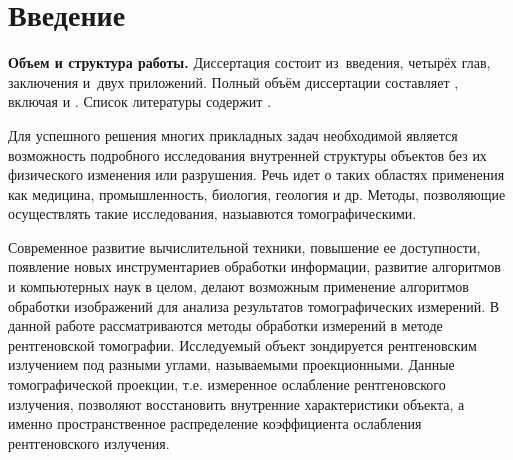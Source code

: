 \chapter*{Введение}							%

\newcommand{\actuality}{}
\newcommand{\progress}{}
\newcommand{\aim}{{\textbf\aimTXT}}
\newcommand{\tasks}{\textbf{\tasksTXT}}
\newcommand{\novelty}{\textbf{\noveltyTXT}}
\newcommand{\influence}{\textbf{\influenceTXT}}
\newcommand{\methods}{\textbf{\methodsTXT}}
\newcommand{\defpositions}{\textbf{\defpositionsTXT}}
\newcommand{\reliability}{\textbf{\reliabilityTXT}}
\newcommand{\probation}{\textbf{\probationTXT}}
\newcommand{\contribution}{\textbf{\contributionTXT}}
\newcommand{\publications}{\textbf{\publicationsTXT}}


\textbf{Объем и структура работы.} Диссертация состоит из~введения, четырёх глав, заключения и~двух приложений.
%
Полный объём диссертации составляет
, включая
 и
.   Список литературы содержит  
.

\actuality



Для успешного решения многих прикладных задач необходимой является возможность подробного исследования внутренней структуры объектов без их физического изменения или разрушения.
Речь идет о таких областях применения как медицина, промышленность, биология, геология и др. 
Методы, позволяющие осуществлять такие исследования, назыавются томографическими.

Современное развитие вычислительной техники, повышение ее доступности, появление новых инструментариев обработки информации, развитие алгоритмов и компьютерных наук в целом, делают возможным применение алгоритмов обработки изображений для анализа результатов томографических измерений.
В данной работе рассматриваются методы обработки измерений в методе рентгеновской томографии.
Исследуемый объект зондируется рентгеновским излучением под разными углами, называемыми проекционными.
Данные томографической проекции, т.е. измеренное ослабление рентгеновского излучения, позволяют восстановить внутренние характеристики объекта, а именно пространственное распределение коэффициента ослабления рентгеновского излучения.


